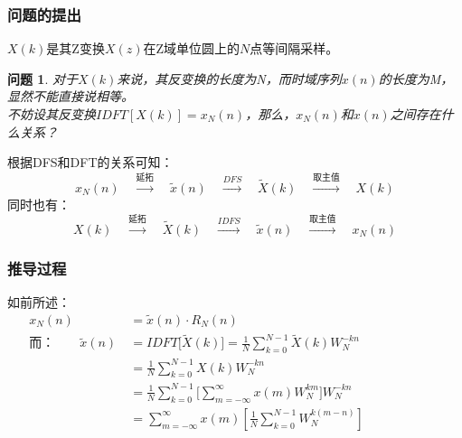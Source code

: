 \documentclass[notheorems,compress,mathserif,table]{beamer}
\newtheorem{theorem}{定理}
\newtheorem{wenti}{问题}
\begin{document}
\begin{frame}[shrink]\frametitle{问题的提出}%
%
%
$X(k)$是其Z变换$X(z)$在Z域单位圆上的$N$点等间隔采样。

\begin{wenti}
	对于$X(k)$来说，其反变换的长度为N，而时域序列$x(n)$的长度为M，显然不能直接说相等。\\
	不妨设其反变换$IDFT[X(k)]=x_N(n)$，那么，$x_N(n)$和$x(n)$之间存在什么关系？
\end{wenti}
根据DFS和DFT的关系可知：
 $$x_N(n)\quad \stackrel{\mbox{延拓}}{\longrightarrow}\quad  \tilde{x}(n)
\quad \stackrel{DFS}{\longrightarrow}\quad \tilde{X}(k)
\quad \stackrel{\mbox{取主值}}{\longrightarrow}\quad X(k)$$
同时也有：
 $$X(k)\quad \stackrel{\mbox{延拓}}{\longrightarrow}\quad  \tilde{X}(k)
\quad \stackrel{IDFS}{\longrightarrow}\quad \tilde{x}(n)
\quad \stackrel{\mbox{取主值}}{\longrightarrow}\quad x_N(n)$$
\end{frame}




\begin{frame}[shrink]\frametitle{推导过程}%
\quad 如前所述：
\begin{equation*}
\begin{split}
x_N(n)  &= \tilde{x}(n)\cdot R_N(n) \qquad\qquad\qquad\qquad\qquad\qquad\qquad\qquad \\
\mbox{而：} \qquad \tilde{x}(n) \:      
        &= IDFT\Big[\tilde{X}(k)\Big] 
        = \frac{1}{N}\sum_{k=0}^{N-1}\tilde{X}(k)W_N^{-kn}\\ 
        &= \frac{1}{N}\sum_{k=0}^{N-1}X(k)W_N^{-kn}\\
        &= \frac{1}{N}\sum_{k=0}^{N-1}\bigg[\sum_{m=-\infty}^{\infty}x(m)W_N^{km}\bigg]W_N^{-kn}\\ 
        &= \sum_{m=-\infty}^{\infty}x(m)\left[\frac{1}{N}\sum_{k=0}^{N-1}W_N^{k(m-n)}\right]\\
\end{split}
\end{equation*}
\end{frame}
\end{document}
